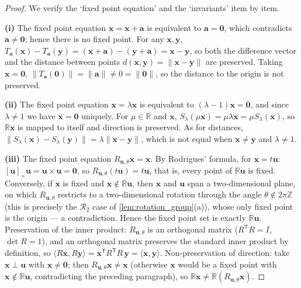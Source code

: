 \begin{proof}
We verify the `fixed point equation' and the `invariants' item by item.

\textbf{(i)} The fixed point equation $\mathbf x = \mathbf x + \mathbf a$ is equivalent to $\mathbf a = \mathbf 0$, which contradicts $\mathbf a\ne\mathbf 0$; hence there is no fixed point. For any $\mathbf x,\mathbf y$, $T_{\mathbf a}(\mathbf x)-T_{\mathbf a}(\mathbf y)=(\mathbf x+\mathbf a)-(\mathbf y+\mathbf a)=\mathbf x-\mathbf y$, so both the difference vector and the distance between points $d(\mathbf x,\mathbf y)=\|\mathbf x-\mathbf y\|$ are preserved. Taking $\mathbf x=\mathbf 0$, $\|T_{\mathbf a}(\mathbf 0)\|=\|\mathbf a\|\ne 0=\|\mathbf 0\|$, so the distance to the origin is not preserved.

\textbf{(ii)} The fixed point equation $\mathbf x=\lambda\mathbf x$ is equivalent to $(\lambda-1)\mathbf x=\mathbf 0$, and since $\lambda\ne1$ we have $\mathbf x=\mathbf 0$ uniquely. For $\mu\in\mathbb R$ and $\mathbf x$, $S_\lambda(\mu\mathbf x)=\mu\lambda\mathbf x=\mu S_\lambda(\mathbf x)$, so $\mathbb R\mathbf x$ is mapped to itself and direction is preserved. As for distances, $\|S_\lambda(\mathbf x)-S_\lambda(\mathbf y)\|=\lambda\|\mathbf x-\mathbf y\|$, which is not equal when $\mathbf x\ne\mathbf y$ and $\lambda\ne1$.

\textbf{(iii)} The fixed point equation $R_{\mathbf u,\theta}\mathbf x=\mathbf x$. By Rodrigues' formula, for $\mathbf x=t\mathbf u$: $[\mathbf u]_\times\mathbf u=\mathbf u\times\mathbf u=\mathbf 0$, so $R_{\mathbf u,\theta}(t\mathbf u)=t\mathbf u$, that is, every point of $\mathbb R\mathbf u$ is fixed. Conversely, if $\mathbf x$ is fixed and $\mathbf x\notin\mathbb R\mathbf u$, then $\mathbf x$ and $\mathbf u$ span a two-dimensional plane, on which $R_{\mathbf u,\theta}$ restricts to a two-dimensional rotation through the angle $\theta\notin2\pi\mathbb Z$ (this is precisely the $\mathcal R_2$ case of \cref{lem:rotation_group}(a)), whose only fixed point is the origin --- a contradiction. Hence the fixed point set is exactly $\mathbb R\mathbf u$. Preservation of the inner product: $R_{\mathbf u,\theta}$ is an orthogonal matrix ($R^{\mathsf T}R=I$, $\det R=1$), and an orthogonal matrix preserves the standard inner product by definition, so $\langle R\mathbf x,R\mathbf y\rangle=\mathbf x^{\mathsf T}R^{\mathsf T}R\,\mathbf y=\langle\mathbf x,\mathbf y\rangle$. Non-preservation of direction: take $\mathbf x\perp\mathbf u$ with $\mathbf x\ne\mathbf 0$; then $R_{\mathbf u,\theta}\mathbf x\ne\mathbf x$ (otherwise $\mathbf x$ would be a fixed point with $\mathbf x\notin\mathbb R\mathbf u$, contradicting the preceding paragraph), so $\mathbb R\mathbf x\ne\mathbb R(R_{\mathbf u,\theta}\mathbf x)$.
\end{proof}

